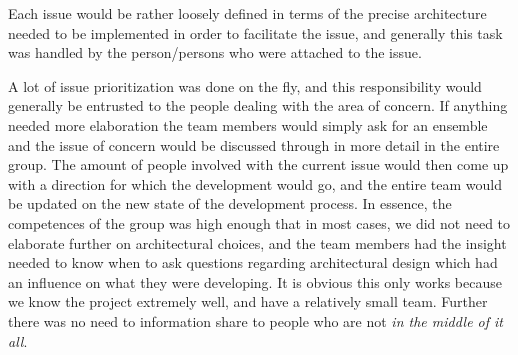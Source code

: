 Each issue would be rather loosely defined in terms of the precise architecture needed to be implemented in order to facilitate the issue, and generally this task was handled by the person/persons who were attached to the issue. 

A lot of issue prioritization was done on the fly, and this responsibility would generally be entrusted to the people dealing with the area of concern. If anything needed more elaboration the team members would simply ask for an ensemble and the issue of concern would be discussed through in more detail in the entire group. The amount of people involved with the current issue would then come up with a direction for which the development would go, and the entire team would be updated on the new state of the development process. In essence, the competences of the group was high enough that in most cases, we did not need to elaborate further on architectural choices, and the team members had the insight needed to know when to ask questions regarding architectural design which had an influence on what they were developing. 
It is obvious this only works because we know the project extremely well, and have a relatively small team. Further there was no need to information share to people who are not \emph{in the middle of it all}.